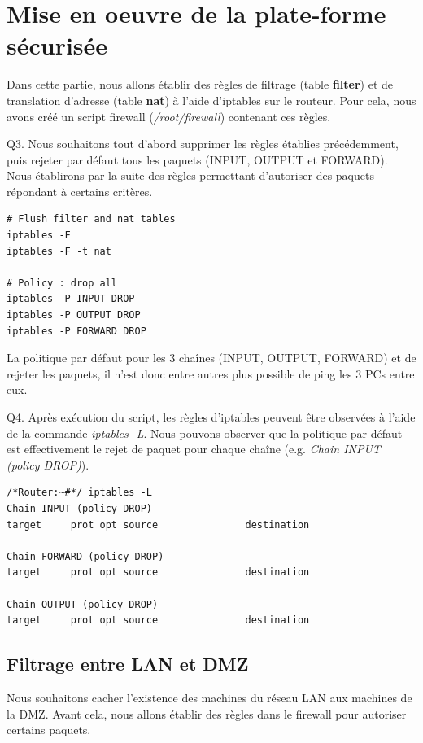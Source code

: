 \documentclass[frenchb, 11pt]{article}
\newlength{\leftbarwidth}
\newlength{\leftbarsep}
\newcommand*{\leftbarcolorcmd}{\color{leftbarcolor}} %
\renewenvironment{leftbar}{%
    \def\FrameCommand{{\leftbarcolorcmd{\vrule width \leftbarwidth\relax\hspace {\leftbarsep}}}}%
    \MakeFramed {\advance \hsize -\width \FrameRestore }%
}{%
    \endMakeFramed
}
\begin{document}
\section{Mise en oeuvre de la plate-forme sécurisée}
Dans cette partie, nous allons établir des règles de filtrage (table \textbf{filter}) et de translation d'adresse (table \textbf{nat}) à l'aide d'iptables sur le routeur. Pour cela, nous avons créé un script firewall (\emph{/root/firewall}) contenant ces règles.

\begin{leftbar}
	\noindent Q3. Nous souhaitons tout d'abord supprimer les règles établies précédemment, puis rejeter par défaut tous les paquets (INPUT, OUTPUT et FORWARD). Nous établirons par la suite des règles permettant d'autoriser des paquets répondant à certains critères.
	\begin{lstlisting}[numbers=none]
# Flush filter and nat tables
iptables -F
iptables -F -t nat

# Policy : drop all
iptables -P INPUT DROP
iptables -P OUTPUT DROP
iptables -P FORWARD DROP
	\end{lstlisting}
\end{leftbar}

La politique par défaut pour les 3 chaînes (INPUT, OUTPUT, FORWARD) et de rejeter les paquets, il n'est donc entre autres plus possible de ping les 3 PCs entre eux.

\begin{leftbar}
	\noindent Q4. Après exécution du script, les règles d'iptables peuvent être observées à l'aide de la commande \emph{iptables -L}. Nous pouvons observer que la politique par défaut est effectivement le rejet de paquet pour chaque chaîne (e.g. \emph{Chain INPUT (policy DROP)}).
	\begin{lstlisting}[numbers=none]
/*Router:~#*/ iptables -L
Chain INPUT (policy DROP)
target     prot opt source               destination         

Chain FORWARD (policy DROP)
target     prot opt source               destination         

Chain OUTPUT (policy DROP)
target     prot opt source               destination
	\end{lstlisting}
\end{leftbar}

\subsection{Filtrage entre LAN et DMZ}
Nous souhaitons cacher l'existence des machines du réseau LAN aux machines de la DMZ. Avant cela, nous allons établir des règles dans le firewall pour autoriser certains paquets.
\end{document}
